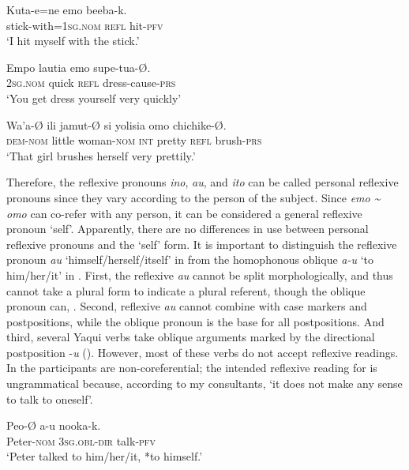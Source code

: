 \documentclass[output=paper]{langscibook}
\begin{document}
\ea
\label{ex:guerrero:9a}
\gll Kuta-e=ne emo beeba-k.\\
stick-with=\textsc{1sg.nom}  \textsc{refl}  hit-\textsc{pfv}\\
\glt ‘I hit myself with the stick.’

\ex
\label{ex:guerrero:9b}
\gll Empo lautia emo supe-tua-Ø.\\
  \textsc{2sg.nom}  quick  \textsc{refl}  dress-cause-\textsc{prs}\\
\glt ‘You get dress yourself very quickly’

\ex
\label{ex:guerrero:9c}
\gll Wa’a-Ø  ili  jamut-Ø  si  yolisia  omo  chichike-Ø.\\
  \textsc{dem-nom}  little  woman-\textsc{nom}  \textsc{int}  pretty  \textsc{refl}      brush-\textsc{prs}\\
\glt ‘That girl brushes herself very prettily.’
\z
\z



Therefore, the reflexive pronouns \textit{ino}, \textit{au}, and \textit{ito} can be called personal reflexive pronouns since they vary according to the person of the subject. Since \textit{emo {\textasciitilde} omo} can co-refer with any person, it can be considered a general reflexive pronoun ‘self’. Apparently, there are no differences in use between personal reflexive pronouns and the ‘self’ form. It is important to distinguish the reflexive pronoun \textit{au} ‘himself/herself/itself’ in  from the homophonous oblique \textit{a-u} ‘to him/her/it’ in . First, the reflexive \textit{au} cannot be split morphologically, and thus cannot take a plural form to indicate a plural referent, though the oblique pronoun can, . Second, reflexive \textit{au} cannot combine with case markers and postpositions, while the oblique pronoun is the base for all postpositions. And third, several Yaqui verbs take oblique arguments marked by the directional postposition -\textit{u} (\citealt{Guerrero2019a, Guerrero2019b}). However, most of these verbs do not accept reflexive readings. In  the participants are non-coreferential; the intended reflexive reading for  is ungrammatical because, according to my consultants, ‘it does not make any sense to talk to oneself’.



\ea%
    \label{ex:guerrero:10}

\ea
\label{ex:guerrero:10a}
\gll Peo-Ø   a-u  nooka-k.\\
  Peter-\textsc{nom}  \textsc{3sg.obl-dir}  talk\textsc{{}-pfv}\\
\glt ‘Peter talked to him/her/it, *to himself.’
\end{document}
